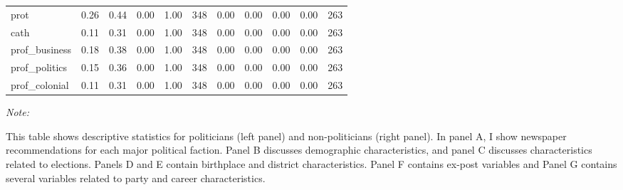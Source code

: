 \begin{table}[!h]
{\begin{threeparttable}
\begin{tabular}[t]{lrrrrrrrrrr}
\hspace{1em}prot & \num{0.26} & \num{0.44} & \num{0.00} & \num{1.00} & 348 & \num{0.00} & \num{0.00} & \num{0.00} & \num{0.00} & 263\\
\hspace{1em}cath & \num{0.11} & \num{0.31} & \num{0.00} & \num{1.00} & 348 & \num{0.00} & \num{0.00} & \num{0.00} & \num{0.00} & 263\\
\hspace{1em}prof\_business & \num{0.18} & \num{0.38} & \num{0.00} & \num{1.00} & 348 & \num{0.00} & \num{0.00} & \num{0.00} & \num{0.00} & 263\\
\hspace{1em}prof\_politics & \num{0.15} & \num{0.36} & \num{0.00} & \num{1.00} & 348 & \num{0.00} & \num{0.00} & \num{0.00} & \num{0.00} & 263\\
\hspace{1em}prof\_colonial & \num{0.11} & \num{0.31} & \num{0.00} & \num{1.00} & 348 & \num{0.00} & \num{0.00} & \num{0.00} & \num{0.00} & 263\\
\bottomrule
\end{tabular}
\begin{tablenotes}[para]
\item \textit{Note: } 
\item This table shows descriptive statistics for politicians (left panel) and non-politicians (right panel). In panel A, I show newspaper recommendations for each major political faction. Panel B discusses demographic characteristics, and panel C discusses characteristics related to elections. Panels D and E contain birthplace and district characteristics. Panel F contains ex-post variables and Panel G contains several variables related to party and career characteristics.
\end{tablenotes}
\end{threeparttable}}
\end{table}
